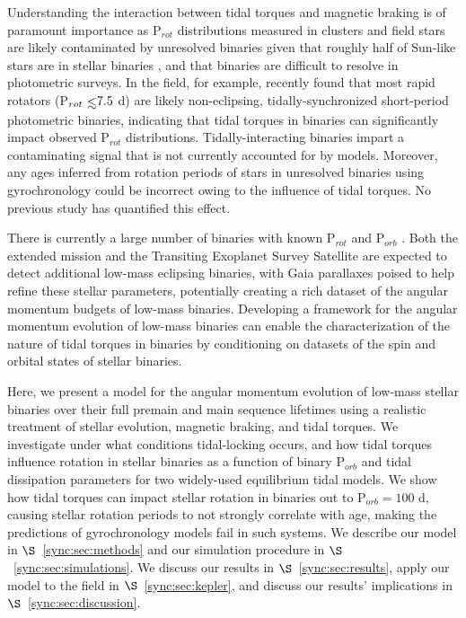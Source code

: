 Understanding the interaction between tidal torques and magnetic braking is of paramount importance as P$_{rot}$ distributions measured in clusters \citep[e.g. Praesepe, ][]{Agueros2011,Douglas2017} and field stars \citep[e.g. \kepler, ][]{Reinhold2013,McQuillan2014} are likely contaminated by unresolved binaries given that roughly half of Sun-like stars are in stellar binaries \citep{Raghavan2010,Duchene2013}, and that binaries are difficult to resolve in photometric surveys. In the \kepler field, for example, \citet{Simonian2018} recently found that most rapid rotators (P$_{rot} \lsim 7.5$ d) are likely non-eclipsing, tidally-synchronized short-period photometric binaries, indicating that tidal torques in binaries can significantly impact observed P$_{rot}$ distributions.  Tidally-interacting binaries impart a contaminating signal that is not currently accounted for by models. Moreover, any ages inferred from rotation periods of stars in unresolved binaries using gyrochronology could be incorrect owing to the influence of tidal torques. No previous study has quantified this effect. 

There is currently a large number of \kepler binaries with known P$_{rot}$ and P$_{orb}$ \citep[e.g.][]{Lurie2017}. Both the extended \kepler mission \citep[K2,][]{Howell2014} and the Transiting Exoplanet Survey Satellite \citep[TESS, ][]{Ricker2014,Sullivan2015} are expected to detect additional low-mass eclipsing binaries, with Gaia parallaxes \citep{Gaia2016} poised to help refine these stellar parameters, potentially creating a rich dataset of the angular momentum budgets of low-mass binaries. Developing a framework for the angular momentum evolution of low-mass binaries can enable the characterization of the nature of tidal torques in binaries by conditioning on datasets of the spin and orbital states of stellar binaries.

Here, we present a model for the angular momentum evolution of low-mass stellar binaries over their full premain and main sequence lifetimes using a realistic treatment of stellar evolution, magnetic braking, and tidal torques. We investigate under what conditions tidal-locking occurs, and how tidal torques influence rotation in stellar binaries as a function of binary P$_{orb}$ and tidal dissipation parameters for two widely-used equilibrium tidal models.  We show how tidal torques can impact stellar rotation in binaries out to P$_{orb} = 100$ d, causing stellar rotation periods to not strongly correlate with age, making the predictions of gyrochronology models fail in such systems.  We describe our model in $\S$~\ref{sync:sec:methods} and our simulation procedure in $\S$~\ref{sync:sec:simulations}.  We discuss our results in $\S$~\ref{sync:sec:results}, apply our model to the \kepler field in $\S$~\ref{sync:sec:kepler}, and discuss our results' implications in $\S$~\ref{sync:sec:discussion}.

